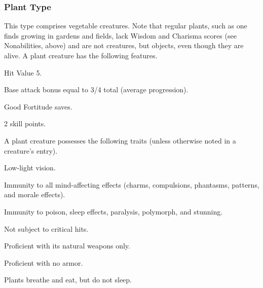 {\subsubsection{Plant Type} This type comprises vegetable creatures. Note that regular plants, such as one finds growing in gardens and fields, lack Wisdom and Charisma scores (see Nonabilities, above) and are not creatures, but objects, even though they are alive. 
 A plant creature has the following features. 
\begin{itemize*}
\item Hit Value 5.
\item Base attack bonus equal to 3/4 total  (average progression).
\item Good Fortitude saves.
\item 2 skill points.
\end{itemize*}
 A plant creature possesses the following traits (unless otherwise noted in a creature's entry).
\begin{itemize*}
\item Low-light vision.
\item Immunity to all mind-affecting effects (charms, compulsions, phantasms, patterns, and morale effects).
\item Immunity to poison, sleep effects, paralysis, polymorph, and stunning.
\item Not subject to critical hits.
\item Proficient with its natural weapons only.
\item Proficient with no armor.
\item Plants breathe and eat, but do not sleep.
\end{itemize*}

}
